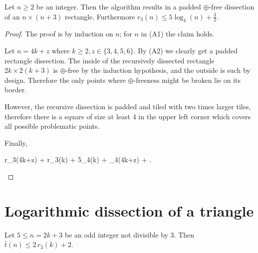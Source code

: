 \begin{lem}
\label{lem:r3n}
Let $n \geq 2$ be an integer. Then the algorithm results in a padded $\oplus$-free dissection of an $n \times (n+3)$ rectangle. Furthermore $r_3(n) \leq 5\log_4(n)+\frac{3}{2}$.
\end{lem}
\begin{proof}
The proof is by induction on $n$; for $n$ in (A1) the claim holds.

Let $n = 4k+z$ where $k \geq 2, z \in \{3,4,5,6\}$. By (A2) we clearly get a padded rectangle dissection. The inside of the recursively dissected rectangle $2k \times 2(k+3)$ is $\oplus$-free by the induction hypothesis, and the outside is such by design. Therefore the only points where $\oplus$-freeness might be broken lie on its border.

However, the recursive dissection is padded and tiled with two times larger tiles, therefore there is a square of size at least 4 in the upper left corner which covers all possible problematic points.

Finally,
\begin{cosyeqnarray}
	r_3(4k+z)  + r_3(k)  + 5\log_4(k) +   \log_4(4k+z) + .
\end{cosyeqnarray}%
\end{proof}

\section{Logarithmic dissection of a triangle}

\begin{lem}
\label{lem:triangles-to-squares}
Let $5 \leq n = 2k+3$ be an odd integer not divisible by 3. Then $\hat t(n) \leq 2\,r_3(k)+2$.
\end{lem}

